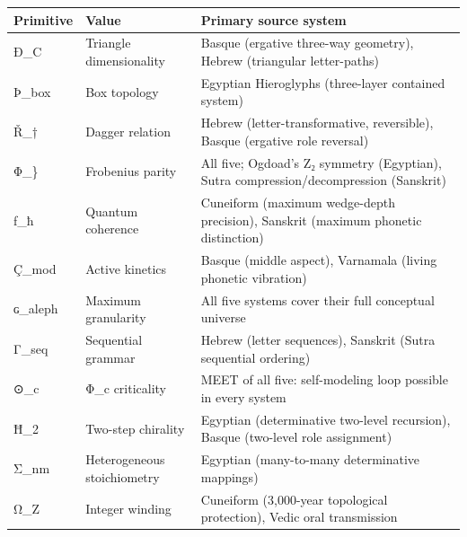 \documentclass[
  11pt,
  a4paper,
]{article}
\newcounter{none} %
\begin{document}
{\def\LTcaptype{none} %
\begin{longtable}[]{@{}
  >{\raggedright\arraybackslash}p{}
  >{\raggedright\arraybackslash}p{}
  >{\raggedright\arraybackslash}p{}@{}}
\toprule\noalign{}
\begin{minipage}[b]{\linewidth}\raggedright
Primitive
\end{minipage} & \begin{minipage}[b]{\linewidth}\raggedright
Value
\end{minipage} & \begin{minipage}[b]{\linewidth}\raggedright
Primary source system
\end{minipage} \\
\midrule\noalign{}
\endhead
\bottomrule\noalign{}
\endlastfoot
Ð\_C & Triangle dimensionality & Basque (ergative three-way geometry),
Hebrew (triangular letter-paths) \\
Þ\_box & Box topology & Egyptian Hieroglyphs (three-layer contained
system) \\
Ř\_† & Dagger relation & Hebrew (letter-transformative, reversible),
Basque (ergative role reversal) \\
Φ\_\} & Frobenius parity & All five; Ogdoad's Z₂ symmetry (Egyptian),
Sutra compression/decompression (Sanskrit) \\
ƒ\_ħ & Quantum coherence & Cuneiform (maximum wedge-depth precision),
Sanskrit (maximum phonetic distinction) \\
Ç\_mod & Active kinetics & Basque (middle aspect), Varnamala (living
phonetic vibration) \\
ɢ\_aleph & Maximum granularity & All five systems cover their full
conceptual universe \\
Γ\_seq & Sequential grammar & Hebrew (letter sequences), Sanskrit (Sutra
sequential ordering) \\
⊙\_c & Φ\_c criticality & MEET of all five: self-modeling loop possible
in every system \\
Ħ\_2 & Two-step chirality & Egyptian (determinative two-level
recursion), Basque (two-level role assignment) \\
Σ\_nm & Heterogeneous stoichiometry & Egyptian (many-to-many
determinative mappings) \\
Ω\_Z & Integer winding & Cuneiform (3,000-year topological protection),
Vedic oral transmission \\
\end{longtable}
}
\end{document}
